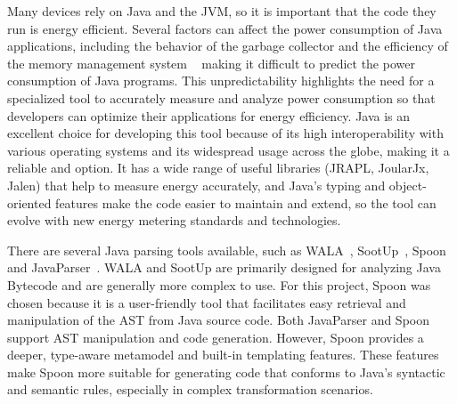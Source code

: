 Many devices rely on Java and the JVM, so it is important that the code they run is energy efficient. Several factors can affect the power consumption of Java applications, including the behavior of the garbage collector and the efficiency of the memory management system ~\cite{10.5555/1267847.1267870} making it difficult to predict the power consumption of Java programs. This unpredictability highlights the need for a specialized tool to accurately measure and analyze power consumption so that developers can optimize their applications for energy efficiency.
Java is an excellent choice for developing this tool because of its high interoperability with various operating systems and its widespread usage across the globe, making it a reliable and option. It has a wide range of useful libraries (JRAPL, JoularJx, Jalen) that help to measure energy accurately, and Java's typing and object-oriented features make the code easier to maintain and extend, so the tool can evolve with new energy metering standards and technologies. 

There are several Java parsing tools available, such as WALA~\cite{wala_main}, SootUp~\cite{sootup_main}, Spoon~\cite{spoon_main} and JavaParser~\cite{javaParser}. WALA and SootUp are primarily designed for analyzing Java Bytecode and are generally more complex to use. For this project, Spoon was chosen because it is a user-friendly tool that facilitates easy retrieval and manipulation of the AST from Java source code. Both JavaParser and Spoon support AST manipulation and code generation. However, Spoon provides a deeper, type-aware metamodel and built-in templating features. These features make Spoon more suitable for generating code that conforms to Java’s syntactic and semantic rules, especially in complex transformation scenarios.



